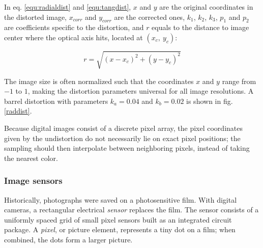 In eq. \ref{equ:radialdist} and \ref{equ:tangdist}, $x$ and $y$ are the original coordinates in the distorted image, $x_{corr}$ and $y_{corr}$ are the corrected ones, $k_1$, $k_2$, $k_3$, $p_1$ and $p_2$ are coefficients specific to the distortion, and $r$ equals to the distance to image center where the optical axis hits, located at $(x_c,~y_c)$:

\begin{equation}
r = \sqrt{(x - x_c)^2 + (y - y_c)^2}
\end{equation}


The image size is often normalized such that the coordinates $x$ and $y$ range from $-1$ to $1$, making the distortion parameters universal for all image resolutions.
A barrel distortion with parameters $k_a = 0.04$ and $k_b = 0.02$ is shown in fig. \ref{raddist}.


Because digital images consist of a discrete pixel array, the pixel coordinates given by the undistortion do not necessarily lie on exact pixel positions;
the sampling should then interpolate between neighboring pixels, instead of taking the nearest color.




\subsubsection{Image sensors} \label{sec:sensors} %


Historically, photographs were saved on a photosensitive film.
With digital cameras, a rectangular electrical \emph{sensor} replaces the film.
The sensor consists of a uniformly spaced grid of small pixel sensors built as an integrated circuit package.
A \emph{pixel}, or picture element, represents a tiny dot on a film; when combined, the dots form a larger picture.

